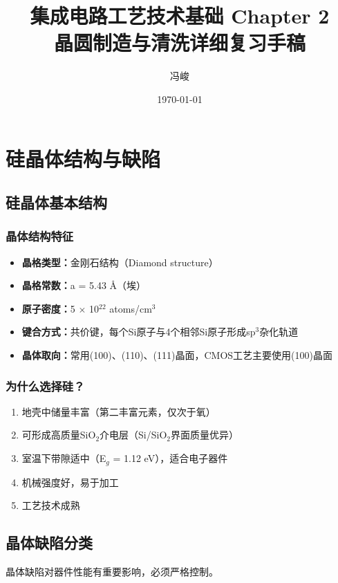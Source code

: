 \documentclass[UTF8,12pt,a4paper]{ctexart}
\title{集成电路工艺技术基础 Chapter 2\\晶圆制造与清洗详细复习手稿}
\author{冯峻}
\date{\today}
\begin{document}
\maketitle
\tableofcontents
\newpage

\section{硅晶体结构与缺陷}

\subsection{硅晶体基本结构}

\subsubsection{晶体结构特征}
\begin{itemize}
    \item \textbf{晶格类型：}金刚石结构（Diamond structure）
    \item \textbf{晶格常数：}a = 5.43 \AA（埃）
    \item \textbf{原子密度：}5 $\times$ 10$^{22}$ atoms/cm$^3$
    \item \textbf{键合方式：}共价键，每个Si原子与4个相邻Si原子形成sp$^3$杂化轨道
    \item \textbf{晶体取向：}常用(100)、(110)、(111)晶面，CMOS工艺主要使用(100)晶面
\end{itemize}

\subsubsection{为什么选择硅？}
\begin{enumerate}
    \item 地壳中储量丰富（第二丰富元素，仅次于氧）
    \item 可形成高质量SiO$_2$介电层（Si/SiO$_2$界面质量优异）
    \item 室温下带隙适中（E$_g$ = 1.12 eV），适合电子器件
    \item 机械强度好，易于加工
    \item 工艺技术成熟
\end{enumerate}

\subsection{晶体缺陷分类}

晶体缺陷对器件性能有重要影响，必须严格控制。
\end{document}
